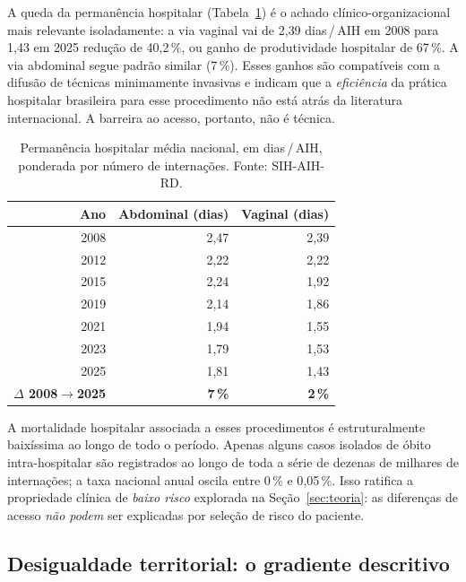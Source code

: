 \documentclass[12pt,a4paper,oneside]{article}
\begin{document}
A queda da permanência hospitalar (Tabela~\ref{tab:nat-perm}) é
o achado clínico-organizacional mais relevante isoladamente: a
via vaginal vai de 2{,}39 dias\,/\,AIH em 2008 para 1{,}43 em
2025 \textemdash{} redução de 40{,}2\,\%, ou ganho de
produtividade hospitalar de 67\,\%. A via abdominal segue padrão
similar (7\,\%). Esses ganhos são compatíveis
com a difusão de técnicas minimamente invasivas e indicam que a
\textit{eficiência} da prática hospitalar brasileira para esse
procedimento não está atrás da literatura internacional. A
barreira ao acesso, portanto, não é técnica.

\begin{table}[H]
\centering
\caption{Permanência hospitalar média nacional, em dias\,/\,AIH,
ponderada por número de internações. Fonte: SIH-AIH-RD.}
\label{tab:nat-perm}
\small
\begin{tabular}{rrr}
\toprule
\textbf{Ano} & \textbf{Abdominal (dias)} & \textbf{Vaginal (dias)} \\
\midrule
2008 & 2{,}47 & 2{,}39 \\
2012 & 2{,}22 & 2{,}22 \\
2015 & 2{,}24 & 1{,}92 \\
2019 & 2{,}14 & 1{,}86 \\
2021 & 1{,}94 & 1{,}55 \\
2023 & 1{,}79 & 1{,}53 \\
2025 & 1{,}81 & 1{,}43 \\
\midrule
\textbf{$\Delta$ 2008$\rightarrow$2025} & \textbf{\textendash 26{,}7\,\%} & \textbf{\textendash 40{,}2\,\%} \\
\bottomrule
\end{tabular}
\end{table}

A mortalidade hospitalar associada a esses procedimentos é
estruturalmente baixíssima ao longo de todo o período. Apenas
alguns casos isolados de óbito intra-hospitalar são registrados
ao longo de toda a série de dezenas de milhares de internações;
a taxa nacional anual oscila entre 0\,\% e 0{,}05\,\%. Isso
ratifica a propriedade clínica de \textit{baixo risco} explorada
na Seção~\ref{sec:teoria}: as diferenças de acesso \textit{não
podem} ser explicadas por seleção de risco do paciente.

\subsection{Desigualdade territorial: o gradiente
descritivo}\label{sub:desigualdade}
\end{document}
